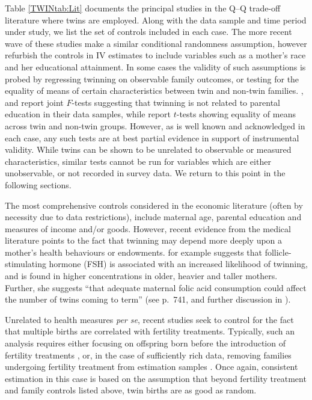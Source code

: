 Table \ref{TWINtab:Lit} documents the principal studies in the Q--Q trade-off 
literature where twins are employed.  Along with the data sample and time period 
under study, we list the set of controls included in each case.  The more recent
wave of these studies make a similar conditional randomness assumption, however
refurbish the controls in IV estimates to include variables such as a mother's 
race and her educational attainment.  In some cases the validity of such 
assumptions is probed by regressing twinning on observable family outcomes, or 
testing for the equality of means of certain characteristics between twin and
non-twin families. \citet{Blacketal2005}, \citet{Lietal2008} and 
\citet{Sanhueza2009} report joint $F$-tests suggesting that twinning is not 
related to parental education in their data samples, while 
\citet{RosenzweigZhang2009} report $t$-tests showing equality of means across 
twin and non-twin groups. However, as is well known and acknowledged in each 
case, any such tests are at best partial evidence in support of instrumental 
validity. While twins can be shown to be unrelated to observable or measured 
characteristics, similar tests cannot be run for variables which are either 
unobservable, or not recorded in survey data. We return to this point in the 
following sections.

The most comprehensive controls considered in the economic literature (often by
necessity due to data restrictions), include maternal age, parental education
and measures of income and/or goods.  However, recent evidence from the medical
literature points to the fact that twinning may depend more deeply upon a 
mother's health behaviours or endowments. \citet{Hall2003} for example suggests 
that follicle-stimulating hormone (FSH) is associated with an increased 
likelihood of twinning, and is found in higher concentrations in older, heavier 
and taller mothers. Further, she suggests ``that adequate maternal folic acid 
consumption could affect the number of twins coming to term'' (see p.\ 741, and 
further discussion in \citet{Lietal2003}).

Unrelated to health measures \emph{per se}, recent studies seek to control for 
the fact that multiple births are correlated with fertility treatments. 
Typically, such an analysis requires either focusing on offspring born before
the introduction of fertility treatments \citep{Caceres2006,Angristetal2010}, 
or, in the case of sufficiently rich data, removing families undergoing 
fertility treatment from estimation samples \citep{Braakman2014}. Once again, 
consistent estimation in this case is based on the assumption that beyond 
fertility treatment and family controls listed above, twin births are as good as 
random.

